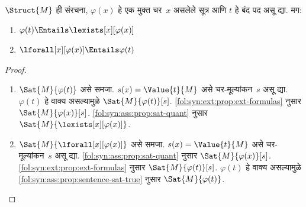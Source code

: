 \begin{prop}\label{fol:syn:sem:prop:quant-terms}
  $\Struct{M}$ ही संरचना, $\varphi(x)$ हे एक मुक्त चर~$x$ असलेले
  सूत्र आणि $t$ हे बंद पद असू द्या. मग:
  \begin{enumerate}
    \item $\varphi(t) \Entails \lexists[x][\varphi(x)]$
    \item $\lforall[x][\varphi(x)] \Entails \varphi(t)$
  \end{enumerate}
\end{prop}

\begin{proof}
  \begin{enumerate}
    \item
      $\Sat{M}{\varphi(t)}$ असे समजा. $s(x) =
        \Value{t}{M}$ असे चर-मूल्यांकन~$s$ असू द्या. $\varphi(t)$ हे
        वाक्य असल्यामुळे $\Sat{M}{\varphi(t)}[s]$.
        \ref{fol:syn:ext:prop:ext-formulas} नुसार
        $\Sat{M}{\varphi(x)}[s]$. \ref{fol:syn:ass:prop:sat-quant} नुसार
        $\Sat{M}{\lexists[x][\varphi(x)]}$.
    \item
      $\Sat{M}{\lforall[x][\varphi(x)]}$ असे समजा.
        $s(x) = \Value{t}{M}$ असे चर-मूल्यांकन~$s$ असू द्या.
        \ref{fol:syn:ass:prop:sat-quant} नुसार $\Sat{M}{\varphi(x)}[s]$.
        \ref{fol:syn:ext:prop:ext-formulas} नुसार
        $\Sat{M}{\varphi(t)}[s]$. $\varphi(t)$ हे वाक्य असल्यामुळे
        \ref{fol:syn:ass:prop:sentence-sat-true} नुसार
        $\Sat{M}{\varphi(t)}$.
  \end{enumerate}
\end{proof}





